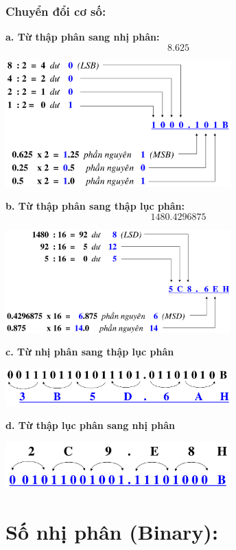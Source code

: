 \subsubsection{Chuyển đổi cơ số:}
\noindent\textbf{a. Từ thập phân sang nhị phân:}
\newpage
\[
  8.625  
\]
\begin{center}
    \includegraphics[width = 0.65\textwidth]{./local/image/1.png}
\end{center}
\textbf{b. Từ thập phân sang thập lục phân:}
\[
    1480.4296875
\]
\begin{center}
    \includegraphics[width = 0.65\textwidth]{./local/image/2.png}
\end{center}
\textbf{c. Từ nhị phân sang thập lục phân}
\begin{center}
    \includegraphics[width = 0.65\textwidth]{./local/image/3.png}
\end{center}
\textbf{d. Từ thập lục phân sang nhị phân}
\begin{center}
    \includegraphics[width = 0.65\textwidth]{./local/image/4.png}
\end{center}
\section{Số nhị phân (Binary):}
